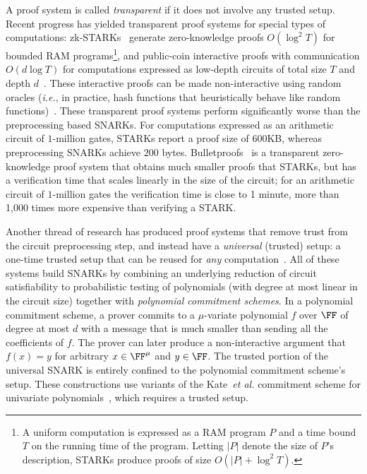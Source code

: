 A proof system is called \emph{transparent} if it does not involve any trusted setup. Recent progress has yielded transparent proof systems for special types of computations: zk-STARKs~\cite{C:BBHR19} generate zero-knowledge proofs $O(\log^2 T)$ for bounded RAM programs\footnote{A uniform computation is expressed as a RAM program $P$ and a time bound $T$ on the running time of the program. Letting $|P|$ denote the size of $P$'s description, STARKs produce proofs of size $O(|P| + \log^2 T)$.}, and public-coin interactive proofs with communication $O(d \log T)$ for computations expressed as low-depth circuits of total size $T$ and depth $d$~\cite{STOC:GolKalRot08}. These interactive proofs can be made non-interactive using random oracles (\emph{i.e.}, in practice, hash functions that heuristically behave like random functions)~\cite{C:FiaSha86,STOC:CCHLRRW19}.
These transparent proof systems perform significantly worse than the preprocessing based SNARKs. For computations expressed as an arithmetic circuit of $1$-million gates, STARKs \cite{C:BBHR19} report a proof size of $600$KB, whereas preprocessing SNARKs achieve $200$ bytes. Bulletproofs~\cite{SP:BBBPWM18, EPRINT:BCCGP16} is a transparent zero-knowledge proof system that obtains much smaller proofs that STARKs, but has a verification time that scales linearly in the size of the circuit; for an arithmetic circuit of $1$-million gates the verification time is close to 1 minute, more than 1,000 times more expensive than verifying a STARK. 


Another thread of research has produced proof systems that remove trust from the circuit preprocessing step, and instead have a \emph{universal} (trusted) setup: a one-time trusted setup that can be reused for \emph{any} computation~\cite{Sonic,Libra,Spartan,Plonk}. All of these systems build SNARKs by combining an underlying reduction of circuit satisfiability to probabilistic testing of polynomials (with degree at most linear in the circuit size) together with \emph{polynomial commitment schemes}. In a polynomial commitment scheme, a prover commits to a $\mu$-variate polynomial $f$ over $\FF$ of degree at most $d$ with a message that is much smaller than sending all the coefficients of $f$. The prover can later produce a non-interactive argument that $f(x) = y$ for arbitrary $x \in \FF^\mu$ and $y \in \FF$. %
The trusted portion of the universal SNARK is entirely confined to the polynomial commitment scheme's setup. These constructions use variants of the Kate~\emph{et al.} commitment scheme for univariate polynomials~\cite{AC:KatZavGol10}, which requires a trusted setup.%

